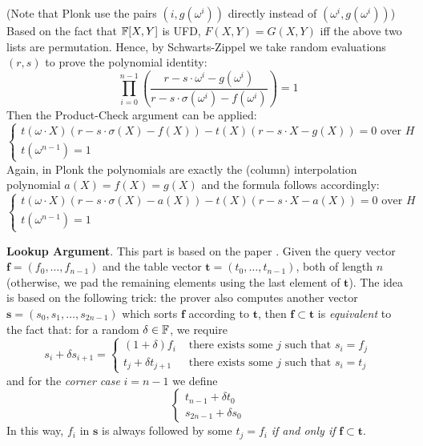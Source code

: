 \documentclass{article}
\begin{document}
(Note that Plonk use the pairs $(i, g(\omega^i))$ directly instead of $(\omega^i, g(\omega^i))$) Based on the fact that $\mathbb{F}[X, Y]$ is UFD, $F(X, Y) = G(X, Y)$ iff the above two lists are permutation. Hence, by Schwarts-Zippel we take random evaluations $(r, s)$ to prove the polynomial identity:
\begin{equation*}
\prod_{i=0}^{n-1} \left( \frac{r -s \cdot \omega^i - g(\omega^i)}{r - s \cdot \sigma(\omega^i) - f(\omega^i)} \right) = 1
\end{equation*}
Then the Product-Check argument can be applied: 
\begin{equation*}
\begin{cases}
t(\omega \cdot X) (r - s \cdot \sigma(X) - f(X)) - t(X) (r - s \cdot X - g(X)) = 0 \text{ over } H\\
t(\omega^{n-1}) = 1
\end{cases}
\end{equation*}
Again, in Plonk the polynomials are exactly the (column) interpolation polynomial $a(X) = f(X) = g(X)$ and the formula follows accordingly:
\begin{equation*}
\begin{cases}
t(\omega \cdot X) (r - s \cdot \sigma(X) - a(X)) - t(X) (r - s \cdot X - a(X)) = 0 \text{ over } H\\
t(\omega^{n-1}) = 1
\end{cases}
\end{equation*}

\textbf{Lookup Argument}. This part is based on the paper \cite{pearson2022plonkup}. Given the query vector $\mathbf{f} = (f_0, \dots, f_{n-1})$ and the table vector $\mathbf{t} = (t_0, \dots, t_{n-1})$, both of length $n$ (otherwise, we pad the remaining elements using the last element of $\mathbf{t}$). The idea is based on the following trick: the prover also computes another vector $\mathbf{s} = (s_0, s_1, \dots, s_{2n-1})$ which sorts $\mathbf{f}$ according to $\mathbf{t}$, then $\mathbf{f} \subset \mathbf{t}$ is \textit{equivalent} to the fact that: for a random $\delta \in \mathbb{F}$, we require 
\begin{equation*}
s_i + \delta s_{i+1} = 
\begin{cases}
(1 + \delta) f_i   &\text{ there exists some $j$ such that } s_i = f_j \\
t_j + \delta t_{j + 1} &\text{ there exists some $j$ such that } s_i = t_j
\end{cases}
\end{equation*} 
and for the \textit{corner case} $i = n-1$ we define
\begin{equation*}
\begin{cases}
t_{n-1} + \delta t_0 \\
s_{2n-1} + \delta s_{0}
\end{cases}
\end{equation*}
In this way, $f_i$ in $\mathbf{s}$ is always followed by some $t_j = f_i$ \textit{if and only if} $\mathbf{f} \subset \mathbf{t}$.
\end{document}
